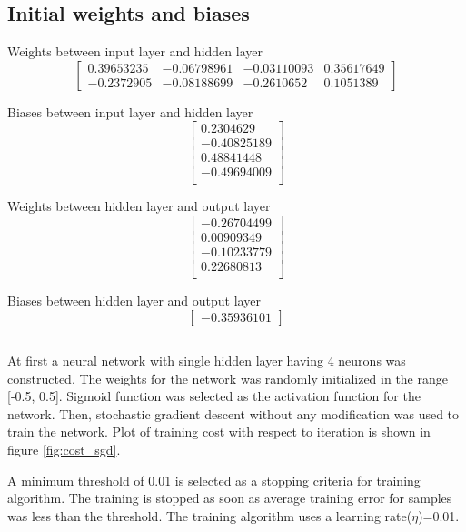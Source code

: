 \section{}

\subsection{Initial weights and biases}
\label{sec:weights}

Weights between input layer and hidden layer
\[
\begin{bmatrix}
    0.39653235 & -0.06798961 & -0.03110093 & 0.35617649 \\
    -0.2372905 & -0.08188699 & -0.2610652 & 0.1051389
\end{bmatrix}
\]

Biases between input layer and hidden layer
\[
\begin{bmatrix}
    0.2304629 \\
    -0.40825189 \\
    0.48841448 \\
    -0.49694009 \\
\end{bmatrix}
\]


Weights between hidden layer and output layer
\[
\begin{bmatrix}
-0.26704499 \\
0.00909349 \\
-0.10233779 \\
0.22680813 \\
\end{bmatrix}
\]

Biases between hidden layer and output layer
\[
\begin{bmatrix}
-0.35936101
\end{bmatrix}
\]

\subsection{}
\label{sec:sgd}
At first a neural network with single hidden layer having 4 neurons was constructed. The weights for the network was
randomly initialized in the range [-0.5, 0.5]. Sigmoid function was selected as the
activation function for the network. Then, stochastic gradient descent without
any modification was used to train the network. Plot of training cost with respect
to iteration is shown in figure \ref{fig:cost_sgd}.

A minimum threshold of 0.01 is selected as a stopping criteria for training algorithm.
The training is stopped as soon as average training error for samples was less than the threshold. The training algorithm
uses a learning rate($\eta$)=0.01.

